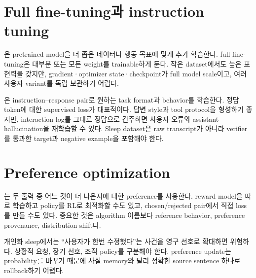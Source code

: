 \section{Full fine-tuning과 instruction tuning}

은 pretrained model을 더 좁은 데이터나 행동 목표에 맞게
추가 학습한다. full fine-tuning은 대부분 또는 모든 weight를 trainable하게 둔다. 작은
dataset에서도 높은 표현력을 갖지만, gradient·optimizer state·checkpoint가 full model
scale이고, 여러 사용자 variant를 독립 보관하기 어렵다.

은 instruction--response pair로 원하는 task format과
behavior를 학습한다. 정답 token에 대한 supervised loss가 대표적이다. 답변 style과 tool
protocol을 형성하기 좋지만, interaction log를 그대로 정답으로 간주하면 사용자 오류와
assistant hallucination을 재학습할 수 있다. Sleep dataset은 raw transcript가 아니라
verifier를 통과한 target과 negative example을 포함해야 한다.

\section{Preference optimization}

는 두 출력 중 어느 것이 더 나은지에 대한
preference를 사용한다. reward model을 따로 학습하고 policy를 RL로 최적화할 수도 있고,
chosen/rejected pair에서 직접 loss를 만들 수도 있다. 중요한 것은 algorithm 이름보다
reference behavior, preference provenance, distribution shift다.

개인화 sleep에서는 ``사용자가 한번 수정했다''는 사건을 영구 선호로 확대하면 위험하다.
상황적 요청, 장기 선호, 조직 policy를 구분해야 한다. preference update는 probability를
바꾸기 때문에 사실 memory와 달리 정확한 source sentence 하나로 rollback하기 어렵다.

